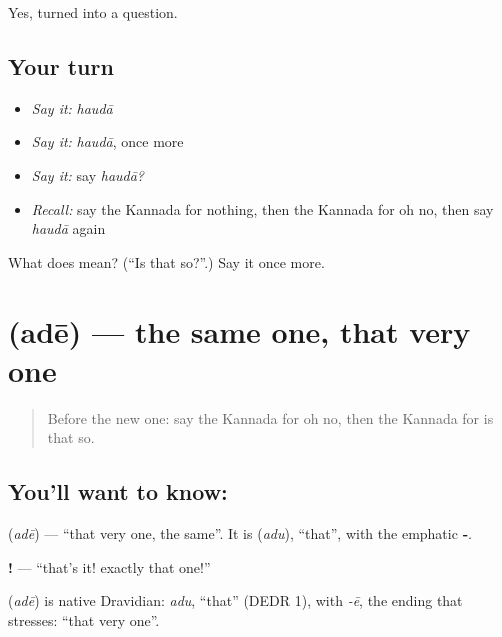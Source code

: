 \begin{grammarlens}[title={What you've built}]
Yes, turned into a question.
\end{grammarlens}

\subsection*{Your turn}
\begin{itemize}
\raggedright
  \item \emph{Say it:} \emph{haudā}
  \item \emph{Say it:} \emph{haudā}, once more
  \item \emph{Say it:} say \emph{haudā?}
  \item \emph{Recall:} say the Kannada for nothing, then the Kannada for oh no, then say \emph{haudā} again
\end{itemize}

\begin{tcolorbox}[breakable,colback=teal!4,colframe=teal!35!black,title={Before you move on}]
What does  mean? (\textquotedblleft{}Is that so?\textquotedblright{}.) Say it once more.
\end{tcolorbox}
\section[\texorpdfstring{\kn{ಅದೇ} (adē)}{ಅದೇ (adē)}]{ (adē) — the same one, that very one}

\label{lesson:KA-C87-thesame}



\begin{quote}
Before the new one: say the Kannada for oh no, then the Kannada for is that so.
\end{quote}

\subsection*{You'll want to know: }
\textbf{} (\emph{adē}) — \textquotedblleft{}that very one, the same\textquotedblright{}. It is \textbf{} (\emph{adu}), \textquotedblleft{}that\textquotedblright{}, with the emphatic \textbf{‑}.

\textbf{!} — \textquotedblleft{}that's it! exactly that one!\textquotedblright{}

\begin{cousinweb}
\textbf{} (\emph{adē}) is native Dravidian: \emph{adu}, \textquotedblleft{}that\textquotedblright{} (DEDR 1), with \emph{-ē}, the ending that stresses: \textquotedblleft{}that very one\textquotedblright{}.
\end{cousinweb}

